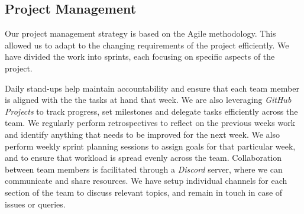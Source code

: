 \subsection{Project Management}

\noindent{}Our project management strategy is based on the Agile methodology.
This allowed us to adapt to the changing requirements of the project
efficiently. We have divided the work into sprints, each focusing on specific
aspects of the project.

\begin{figure}[h]
\end{figure}

\pagebreak{}

\noindent{}Daily stand-ups help maintain accountability and ensure that each
team member is aligned with the the tasks at hand that week. We are also
leveraging \textit{GitHub Projects} to track progress, set milestones and
delegate tasks efficiently across the team. We regularly perform retrospectives
to reflect on the previous weeks work and identify anything that needs to be
improved for the next week. We also perform weekly sprint planning sessions to
assign goals for that particular week, and to ensure that workload is spread
evenly across the team. Collaboration between team members is facilitated
through a \textit{Discord} server, where we can communicate and share resources.
We have setup individual channels for each section of the team to discuss
relevant topics, and remain in touch in case of issues or queries.

